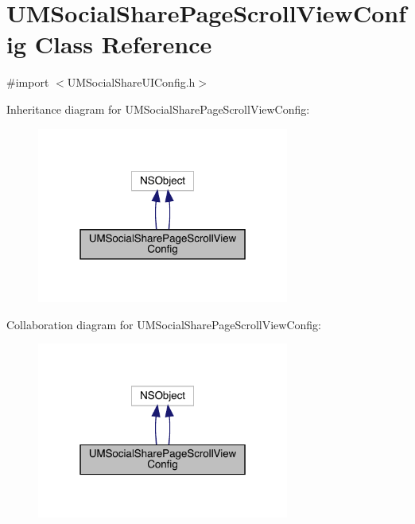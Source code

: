 \hypertarget{interface_u_m_social_share_page_scroll_view_config}{}\section{U\+M\+Social\+Share\+Page\+Scroll\+View\+Config Class Reference}
\label{interface_u_m_social_share_page_scroll_view_config}


{\ttfamily \#import $<$U\+M\+Social\+Share\+U\+I\+Config.\+h$>$}



Inheritance diagram for U\+M\+Social\+Share\+Page\+Scroll\+View\+Config\+:\nopagebreak
\begin{figure}[H]
\begin{center}
\leavevmode
\includegraphics[width=235pt]{interface_u_m_social_share_page_scroll_view_config__inherit__graph}
\end{center}
\end{figure}


Collaboration diagram for U\+M\+Social\+Share\+Page\+Scroll\+View\+Config\+:\nopagebreak
\begin{figure}[H]
\begin{center}
\leavevmode
\includegraphics[width=235pt]{interface_u_m_social_share_page_scroll_view_config__coll__graph}
\end{center}
\end{figure}
